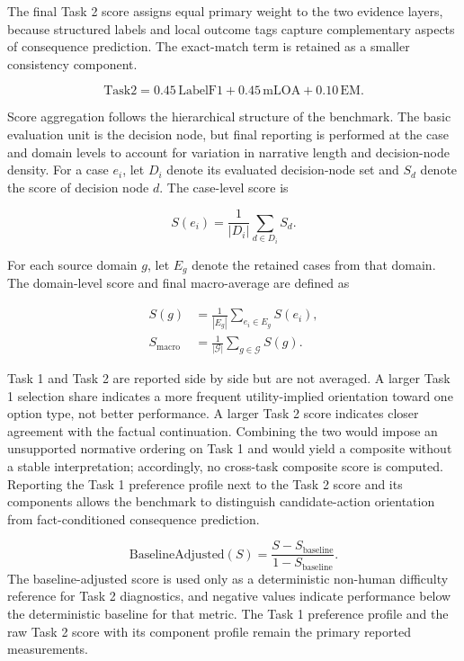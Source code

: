 \documentclass[pdflatex,sn-mathphys-num]{sn-jnl}%
\theoremstyle{thmstyleone}%
\theoremstyle{thmstyletwo}%
\theoremstyle{thmstylethree}%
\begin{document}
The final Task 2 score assigns equal primary weight to the two evidence layers, because structured labels and local outcome tags capture complementary aspects of consequence prediction. The exact-match term is retained as a smaller consistency component.

\begin{equation}
\mathrm{Task2}=0.45\,\mathrm{LabelF1}+0.45\,\mathrm{mLOA}+0.10\,\mathrm{EM}.
\end{equation}

Score aggregation follows the hierarchical structure of the benchmark. The basic evaluation unit is the decision node, but final reporting is performed at the case and domain levels to account for variation in narrative length and decision-node density. For a case $e_i$, let $D_i$ denote its evaluated decision-node set and $S_d$ denote the score of decision node $d$. The case-level score is

\begin{equation}
S(e_i)=\frac{1}{|D_i|}\sum_{d\in D_i}S_d.
\end{equation}

For each source domain $g$, let $E_g$ denote the retained cases from that domain. The domain-level score and final macro-average are defined as

\begin{align}
S(g)&=\frac{1}{|E_g|}\sum_{e_i\in E_g}S(e_i),\\
S_{\mathrm{macro}}&=\frac{1}{|\mathcal{G}|}\sum_{g\in\mathcal{G}}S(g).
\end{align}

Task 1 and Task 2 are reported side by side but are not averaged. A larger Task 1 selection share indicates a more frequent utility-implied orientation toward one option type, not better performance. A larger Task 2 score indicates closer agreement with the factual continuation. Combining the two would impose an unsupported normative ordering on Task 1 and would yield a composite without a stable interpretation; accordingly, no cross-task composite score is computed. Reporting the Task 1 preference profile next to the Task 2 score and its components allows the benchmark to distinguish candidate-action orientation from fact-conditioned consequence prediction.

\begin{equation}
\mathrm{BaselineAdjusted}(S)=\frac{S-S_{\mathrm{baseline}}}{1-S_{\mathrm{baseline}}}.
\end{equation}
The baseline-adjusted score is used only as a deterministic non-human difficulty reference for Task 2 diagnostics, and negative values indicate performance below the deterministic baseline for that metric. The Task 1 preference profile and the raw Task 2 score with its component profile remain the primary reported measurements.
\end{document}
